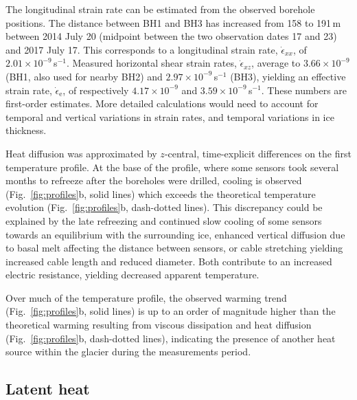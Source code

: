 \documentclass[utf8]{article}
\begin{document}
    The longitudinal strain rate can be estimated from the observed borehole
    positions. The distance between BH1 and BH3
    has increased from 158 to 191\,m between 2014 July 20 (midpoint
    between the two observation dates 17 and 23) and 2017 July 17. This
    corresponds to a longitudinal strain rate, $\dot\epsilon_{xx}$, of
    $2.01\times10^{-9}$\,s$^{-1}$. Measured horizontal shear strain rates,
    $\dot\epsilon_{xz}$, average to $3.66\times10^{-9}$ (BH1, also used for
    nearby BH2) and $2.97\times10^{-9}$\,s$^{-1}$ (BH3), yielding an effective
    strain rate, $\dot\epsilon_\mathrm{e}$, of respectively $4.17\times10^{-9}$
    and $3.59\times10^{-9}$\,s$^{-1}$. These numbers are first-order estimates.
    More detailed calculations would need to account for temporal and
    vertical variations in strain rates, and temporal variations in ice
    thickness.

    Heat diffusion was approximated by $z$-central, time-explicit differences
    on the first temperature profile. At the base of the profile, where
    some sensors took several months to refreeze after the boreholes were
    drilled, cooling is observed (Fig.~\ref{fig:profiles}b, solid lines) which
    exceeds the theoretical temperature evolution (Fig.~\ref{fig:profiles}b,
    dash-dotted lines). This discrepancy could be explained by the late
    refreezing and continued slow cooling of some sensors towards an equilibrium
    with the surrounding ice, enhanced vertical diffusion due to basal melt
    affecting the distance between sensors, or cable stretching
    yielding increased cable length and reduced diameter. Both contribute to an
    increased electric resistance, yielding decreased apparent temperature.

    Over much of the temperature profile, the observed warming trend
    (Fig.~\ref{fig:profiles}b, solid lines) is up to an order of magnitude
    higher than the theoretical warming resulting from viscous
    dissipation and heat diffusion (Fig.~\ref{fig:profiles}b, dash-dotted
    lines), indicating the presence of another heat source within the glacier
    during the measurements period.


\subsection{Latent heat}
\end{document}
